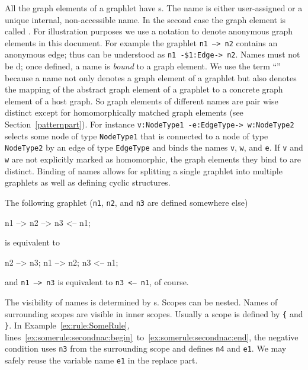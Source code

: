 All the graph elements of a graphlet have s.
The name is either user-assigned or a unique internal, non-accessible name.
In the second case the graph element is called .
For illustration purposes we use a  notation to denote anonymous graph elements in this document.
For example the graphlet \texttt{n1 --> n2} contains an anonymous edge; thus can be understood as \texttt{n1 -\$1:Edge-> n2}.
Names must not be d; once defined, a name is \emph{bound} to a graph element. 
We use the term ``'' because a name not only denotes a graph element of a graphlet but also denotes the mapping of the abstract graph element of a graphlet to a concrete graph element of a host graph.
So graph elements of different names are pair wise distinct except for homomorphically matched graph elements (see Section~\ref{patternpart}).
For instance \texttt{v:NodeType1 -e:EdgeType-> w:NodeType2} selects some node of type \texttt{Node\-Type1} that is connected to a node of type \texttt{NodeType2} by an edge of type \texttt{EdgeType} and binds the names \texttt{v}, \texttt{w}, and \texttt{e}. 
If \texttt{v} and \texttt{w} are not explicitly marked as homomorphic, the graph elements they bind to are distinct.
Binding of names allows for splitting a single graphlet into multiple graphlets as well as defining cyclic structures.
\begin{example}
The following graphlet (\texttt{n1}, \texttt{n2}, and \texttt{n3} are defined somewhere else)
\begin{grgen}
n1 --> n2 --> n3 <-- n1;
\end{grgen}
is equivalent to
\begin{grgen}
n2 --> n3;
n1 --> n2;
n3 <-- n1;
\end{grgen}
and \texttt{n1 --> n3} is equivalent to \texttt{n3 <-- n1}, of course.
\end{example}
The visibility of names is determined by s. 
Scopes can be nested. 
Names of surrounding scopes are visible in inner scopes. 
Usually a scope is defined by \texttt{\{} and \texttt{\}}. %
In Example~\ref{ex:rule:SomeRule}, lines~\ref{ex:somerule:secondnac:begin}~to~\ref{ex:somerule:secondnac:end}, the negative condition uses \texttt{n3} from the surrounding scope and defines \texttt{n4} and \texttt{e1}. 
We may safely reuse the variable name \texttt{e1} in the replace part.


